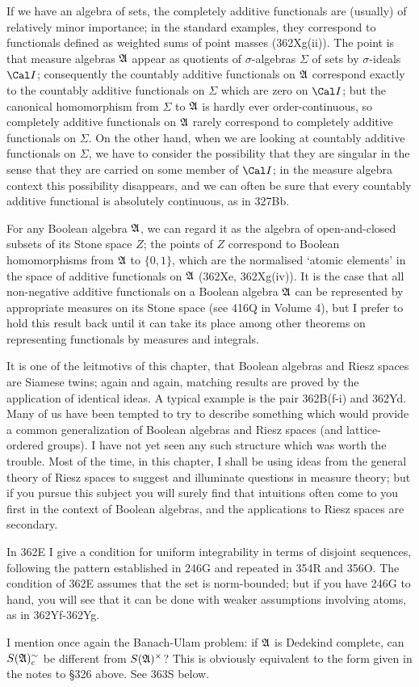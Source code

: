 {If we have an algebra of sets, the completely additive functionals are
(usually) of relatively minor importance;  in the standard examples,
they correspond to functionals defined as weighted sums of point masses
(362Xg(ii)).   The point is that measure algebras $\frak A$ appear as
quotients of $\sigma$-algebras $\Sigma$ of sets by $\sigma$-ideals $\Cal
I$;  consequently the countably additive functionals on $\frak A$
correspond exactly to the countably additive functionals on $\Sigma$
which are zero on $\Cal I$;  but the canonical homomorphism from
$\Sigma$ to $\frak A$ is hardly ever order-continuous, so
completely additive functionals on $\frak A$ rarely correspond to
completely additive
functionals on $\Sigma$.
On the other hand, when we are looking at countably additive functionals
on $\Sigma$, we have to consider the possibility that they are singular
in the sense that they are carried on some member of $\Cal I$;  in the
measure algebra context this possibility disappears, and we can often be
sure that every countably additive functional is absolutely continuous,
as in 327Bb.

For any Boolean algebra $\frak A$, we can regard it as the algebra of
open-and-closed subsets of its Stone space $Z$;  the points of $Z$
correspond to Boolean homomorphisms from $\frak A$ to $\{0,1\}$, which
are the normalised `atomic elements'
in the space of additive functionals on
$\frak A$ (362Xe, 362Xg(iv)).   It is the case that all non-negative
additive functionals on a Boolean algebra $\frak A$ can be represented
by appropriate measures on its Stone space (see 416Q in Volume 4), but I
prefer to
hold this result back until it can take its place among other theorems
on representing functionals by measures and integrals.

It is one of the leitmotivs of this chapter, that Boolean algebras and
Riesz spaces are Siamese twins;  again and again, matching results are
proved by the application of identical ideas.   A typical example is the
pair 362B(f-i) and 362Yd.   Many of us have been tempted to try to
describe something which would provide a common generalization of
Boolean algebras and Riesz spaces (and lattice-ordered groups).   I have
not yet seen any such structure which was worth the trouble.   Most of
the time, in this chapter, I shall be using ideas from the general
theory of Riesz spaces to suggest and illuminate questions in measure
theory;  but if you pursue this subject you will surely find that
intuitions often come to you first in the context of Boolean algebras,
and the applications to Riesz spaces are secondary.

In 362E I give a condition for uniform integrability in terms of
disjoint sequences, following the pattern established in 246G and
repeated in 354R and 356O.   The condition of 362E assumes that
the set is norm-bounded;  but if you have 246G to hand, you will see
that it can be done with weaker assumptions involving atoms, as in
362Yf-362Yg.

I mention once again the Banach-Ulam problem:  if $\frak A$ is Dedekind
complete, can $S(\frak A)^{\sim}_c$ be different from
$S(\frak A)^{\times}$?   This is obviously equivalent to the form given
in the notes to \S326 above.   See 363S below.
}%

\discrpage

